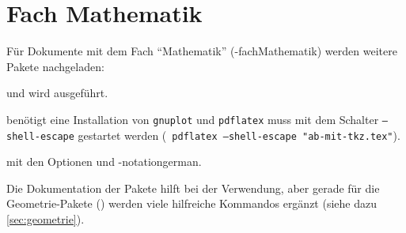 \section{Fach Mathematik}\label{sec:fachmathe}

Für Dokumente mit dem Fach \enquote{Mathematik} (\keyis*-{fach}{Mathematik}) werden weitere Pakete nachgeladen:
\begin{multicols}{2}
	\begin{smallitemize}
		\item {}
		\item {}
		\item {}
		\item {}
		\item {}
		\item {}
		\item {} und  wird ausgeführt.
		\item {} benötigt eine Installation von \texttt{gnuplot} und \texttt{pdflatex} muss mit dem Schalter \texttt{--shell-escape} gestartet werden (\zB\  \texttt{pdflatex --shell-escape "ab-mit-tkz.tex"}).
		\item {} mit den Optionen  und \keyis*-{notation}{german}.
		\item {}
	\end{smallitemize}
\end{multicols}

Die Dokumentation der Pakete hilft bei der Verwendung, aber gerade für die Geometrie-Pakete () werden viele hilfreiche Kommandos ergänzt (siehe dazu \ref{sec:geometrie}).

